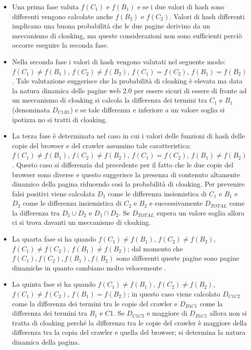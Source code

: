 \begin{itemize}
 \item Una prima fase valuta \(f(C_1)\) e \(f(B_1)\) e se i due valori di hash sono differenti vengono calcolate anche \(f(B_2)\) e \(f(C_2)\). Valori di hash differenti implicano una buona probabilità che le due pagine derivino da un meccanismo di cloaking, ma queste considerazioni non sono sufficienti perciò occorre eseguire la seconda fase.
 
 \item Nella seconda fase i valori di hash vengono valutati nel seguente modo: \(f(C_1)\not =f(B_1)\), \(f(C_2)\not=f(B_2)\), \(f(C_1)=f(C_2)\), \(f(B_1)=f(B_2)\). Tale valutazione suggerisce che la probabilità di cloaking è elevata ma data la natura dinamica delle pagine web 2.0 per essere sicuri di essere di fronte ad un meccanismo di cloaking si calcola la differenza dei termini tra \(C_1\) e \(B_1\) (denominata \(D_{C1B1}\)) e se tale differenza e inferiore a un valore soglia si ipotizza no si tratti di cloaking.
 
 \item La terza fase è determinata  nel  caso in cui i valori delle funzioni di hash delle copie del browser e del crawler assumino tale caratteristica: \(f(C_1)\not=f(B_1)\), \(f(C_2)\not=f(B_2)\), \(f(C_1)=f(C_2)\), \(f(B_1)\not=f(B_2)\). Questo caso si differenzia dal precedente per il fatto che le due copie del browser sono diverse e questo suggerisce la presenza di contenuto altamente dinamico della pagina riducendo cosi la probabilità di cloaking. Per prevenire falsi positivi viene calcolata \(D_1\) come le differenza insiemistica di \(C_1\) e \(B_1\) e \(D_2\) come le differenza insiemistica di \(C_2\) e \(B_2\) e successivamente \(D_{TOTAL}\) come la differenza tra \(D_1\cup D_2\) e \(D_1 \cap D_2\). Se \(D_{TOTAL}\) supera un valore soglia allora ci si trova davanti un meccanismo di cloaking.
 
 \item La quarta fase si ha quando \(f(C_1)\not=f(B_1)\), \(f(C_2)\not=f(B_2)\), \(f(C_1)\not=f(C_2)\), \(f(B_1)\not=f(B_2)\); dal momento che \(f(C_1),f(C_2),f(B_1),f(B_2)\) sono differenti queste pagine sono pagine dinamiche in quanto cambiano molto velocemente . 
 
 \item La quinta fase si ha quando \(f(C_1)\not=f(B_1)\), \(f(C_2)\not=f(B_2)\), \(f(C_1)\not=f(C_2)\), \(f(B_1)=f(B_2)\); in questo caso viene calcolato \(D_{C1C2}\) come la differenza dei termini tra le copie del crawler e \(D_{B1C1}\) come la differenza dei termini tra \(B_1\) e \(C1\). Se \(D_{C1C2}\) e maggiore di \(D_{B1C1}\) allora non si tratta di cloaking perché la differenza tra le copie del crawler è maggiore della differenza tra la copia del crawler e quella del browser; si determina la natura dinamica della pagina. 
\end{itemize}
